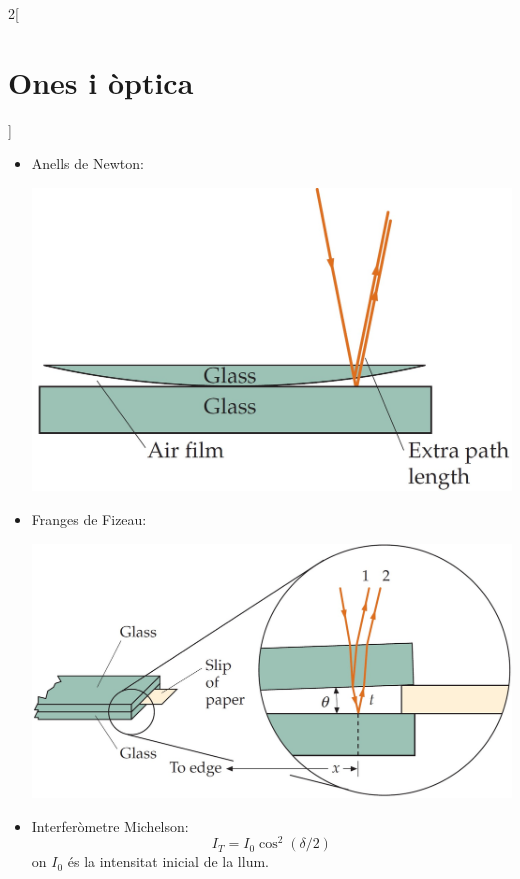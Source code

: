 \documentclass[class=article,10pt,crop=false]{standalone}
\begin{document}
\begin{multicols}{2}[\section{Ones i òptica}]
\begin{itemize}
\begin{itemize}
        \item Anells de Newton:\newline
        \begin{minipage}{\linewidth}
           \centering \includegraphics[width=\linewidth]{Physics/1st/Waves_and_optics/Images/newton.jpg} 
        \end{minipage}
        \item Franges de Fizeau:\newline
        \begin{minipage}{\linewidth}
            \includegraphics[width=\linewidth]{Physics/1st/Waves_and_optics/Images/fizeau.jpg} 
        \end{minipage}
        \item Interferòmetre Michelson: $$I_T=I_0\cos^2(\delta/2)$$ {\footnotesize on $I_0$ és la intensitat inicial de la llum.}\newline

\end{itemize}
\end{itemize}
\end{multicols}
\end{document}
